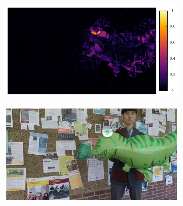 \documentclass{article}
\begin{document}
\begin{figure}
\begin{subfigure}{0.33\textwidth}
	\centering
    \includegraphics[width=1\linewidth]{nd_scene/Balloon1_error.png}
\end{subfigure}%
\begin{subfigure}{0.33\textwidth}
	\centering
    \includegraphics[width=1\linewidth]{nd_scene/Balloon1_GT.jpg}
\end{subfigure}


\end{figure}
\end{document}
